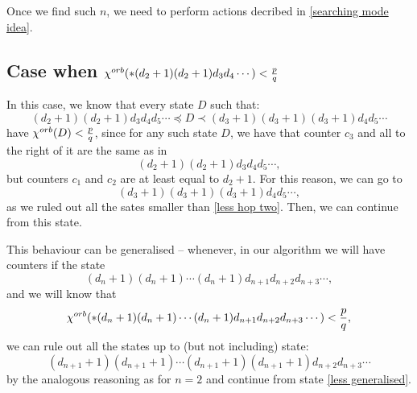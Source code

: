 Once we find such $n$, we need to perform actions decribed in \ref{searching mode idea}.  


\subsection{Case when ${\chi^{orb}(*(d_2+1)(d_2+1)d_3d_4\cdots)} < \frac{p}{q}$}\label{Less idea}

In this case, we know that every state $D$ such that:
\begin{equation}
(d_2+1)(d_2+1)d_3d_4d_5\cdots \preceq D\prec (d_3+1)(d_3+1)(d_3+1)d_4d_5\cdots
\end{equation}
have ${\chi^{orb}(D)} < \frac{p}{q}$, since for any such state $D$, we have that 
counter $c_3$ and all to the right of it are the same as in 
\begin{equation}
(d_2+1)(d_2+1)d_3d_4d_5\cdots,
\end{equation}
but counters $c_1$ and $c_2$ are at least equal to $d_2+1$. For this reason, we can 
go to 
\begin{equation}\label{less hop two}
(d_3+1)(d_3+1)(d_3+1)d_4d_5\cdots, 
\end{equation}
as we ruled out all the sates smaller than \ref{less hop two}. Then, we can continue 
from this state.

This behaviour can be generalised -- whenever, in our algorithm we will have counters 
if the state 
\begin{equation}
(d_n+1)(d_n+1)\cdots (d_n + 1)d_{n+1}d_{n+2}d_{n+3}\cdots,
\end{equation} 
and we will know that 
\begin{equation}
{\chi^{orb}(*(d_n+1)(d_n+1)\cdots (d_n + 1)d_{n+1}d_{n+2}d_{n+3}\cdots)} < \frac{p}{q},
\end{equation} 
we can rule out all the states up to (but not including) state:
\begin{equation}\label{less generalised}
(d_{n+1}+1)(d_{n+1}+1)\cdots (d_{n+1} + 1)(d_{n+1}+1)d_{n+2}d_{n+3}\cdots
\end{equation}
by the analogous reasoning as for $n = 2$ and continue from state \ref{less generalised}.

